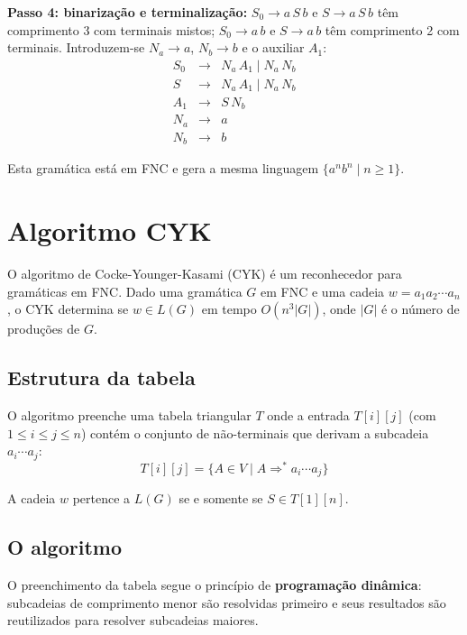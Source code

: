 \textbf{Passo 4: binarização e terminalização:} $S_0 \to a\,S\,b$ e $S \to a\,S\,b$ têm comprimento 3 com terminais mistos; $S_0 \to a\,b$ e $S \to a\,b$ têm comprimento 2 com terminais. Introduzem-se $N_a \to a$, $N_b \to b$ e o auxiliar $A_1$:
\[
  \begin{array}{lcl}
    S_0 & \to & N_a\,A_1 \mid N_a\,N_b \\
    S   & \to & N_a\,A_1 \mid N_a\,N_b \\
    A_1 & \to & S\,N_b \\
    N_a & \to & a \\
    N_b & \to & b
  \end{array}
\]

Esta gramática está em FNC e gera a mesma linguagem $\{a^n b^n \mid n \geq 1\}$.

\section{Algoritmo CYK}

O algoritmo de Cocke-Younger-Kasami (CYK) é um reconhecedor para gramáticas em FNC. Dado uma gramática $G$ em FNC e uma cadeia $w = a_1 a_2 \cdots a_n$, o CYK determina se $w \in L(G)$ em tempo $O(n^3 |G|)$, onde $|G|$ é o número de produções de $G$.

\subsection{Estrutura da tabela}

O algoritmo preenche uma tabela triangular $T$ onde a entrada $T[i][j]$ (com $1 \leq i \leq j \leq n$) contém o conjunto de não-terminais que derivam a subcadeia $a_i \cdots a_j$:
\[
  T[i][j] = \{ A \in V \mid A \Rightarrow^* a_i \cdots a_j \}
\]

A cadeia $w$ pertence a $L(G)$ se e somente se $S \in T[1][n]$.

\subsection{O algoritmo}

O preenchimento da tabela segue o princípio de \textbf{programação dinâmica}: subcadeias de comprimento menor são resolvidas primeiro e seus resultados são reutilizados para resolver subcadeias maiores.

